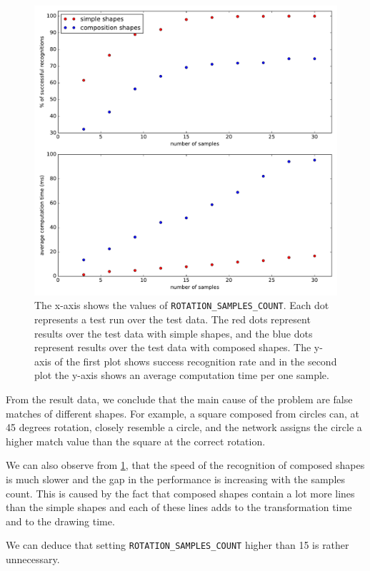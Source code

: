 \begin{figure}
\centering
\includegraphics[width=\linewidth]{ext/rotation_cmb.pdf}
\caption{The x-axis shows the values of \texttt{ROTATION\_SAMPLES\_COUNT}. Each dot represents a test run over the test data. The red dots represent results over the test data with simple shapes, and the blue dots represent results over the test data with composed shapes. The y-axis of the first plot shows success recognition rate and in the second plot the y-axis shows an average computation time per one sample.}
\label{fig:rotation}
\end{figure}

From the result data, we conclude that the main cause of the problem are false matches of different shapes. For example, a square composed from circles can, at 45 degrees rotation, closely resemble a circle, and the network assigns the circle a higher match value than the square at the correct rotation. 

We can also observe from \cref{fig:rotation}, that the speed of the recognition of composed shapes is much slower and the gap in the performance is increasing with the samples count. This is caused by the fact that composed shapes contain a lot more lines than the simple shapes and each of these lines adds to the transformation time and to the drawing time.

We can deduce that setting \texttt{ROTATION\_SAMPLES\_COUNT} higher than 15 is rather unnecessary.


